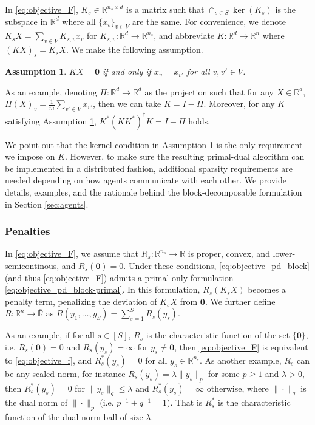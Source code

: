 \documentclass[10pt]{article}
\newcommand{\mb}{\mathbf}
\newcommand{\R}{\mathbb{R}}
\newtheorem{assumption}{Assumption}[section]
\begin{document}
In \eqref{eq:objective_F}, $K_s\in \R^{n_s\times d}$ is a matrix such that $\cap_{s\in S} \ker(K_s)$ is the subspace in $\R^{d}$ where all $\{x_v\}_{v\in V}$ are the same. For convenience, we denote $K_sX = \sum_{v\in V} K_{s,v}x_v$ for $K_{s,v}:\R^{\overline{d}}\to \R^{n_s}$, and abbreviate $K:\R^{d}\to \R^n$ where $(KX)_s = K_sX$. We make the following assumption. 
\begin{assumption}\label{assumption:kernel}
    $KX = \mb 0$ if and only if $x_v=x_{v'}$ for all $v,v'\in V$. 
\end{assumption}
As an example, denoting $\Pi:\R^{d}\to \R^{d}$ as the projection such that for any $X\in \R^{d}$, $\Pi(X)_v = \frac{1}{m}\sum_{v'\in V}x_{v'}$, then we can take $K = I-\Pi$. Moreover, for any $K$ satisfying Assumption \ref{assumption:kernel}, $K^*(KK^*)^{\dagger}K = I- \Pi$ holds.

We point out that the kernel condition in Assumption \ref{assumption:kernel} is the only requirement we impose on $K$. However, to make sure the resulting primal-dual algorithm can be implemented in a distributed fashion, additional sparsity requirements are needed depending on how agents communicate with each other. We provide details, examples, and the rationale behind the block-decomposable formulation in Section \ref{sec:agents}. 




\subsubsection{Penalties}


In \eqref{eq:objective_F}, we assume that $R_s:
\R^{n_s}\to \overline{\R}$ is proper, convex, and lower-semicontinous, and $R_s(\mb 0) = 0$. 
Under these conditions, \eqref{eq:objective_pd_block} (and thus \eqref{eq:objective_F}) admits a primal-only formulation \eqref{eq:objective_pd_block-primal}. In this formulation, $R_s(K_sX)$ becomes a penalty term, penalizing the deviation of $K_sX$ from $\mb 0$. We further define $R:\R^n\to \overline{\R}$ as $R(y_1,\ldots,y_S) = \sum_{s=1}^SR_s(y_s)$. 



As an example, if for all $s\in [S]$, $R_s$ is the characteristic function of the set $\{\mb 0\}$, i.e. $R_s(\mb 0) = 0$ and $R_s(y_s) = \infty$ for $y_s \neq \mb 0$, then \eqref{eq:objective_F} is equivalent to \eqref{eq:objective_f}, and $R_s^*(y_s) = 0$ for all $y_s\in \R^{n_s}$. As another example, $R_s$ can be any scaled norm, for instance $R_s(y_s) = \lambda \|y_s\|_p$ for some $p\geq 1$ and $\lambda>0$, then $R_s^*(y_s) = 0$ for $\|y_s\|_q\leq \lambda$ and $R_s^*(y_s) = \infty$ otherwise, where $\|\cdot \|_q $ is the dual norm of $\|\cdot\|_p$ (i.e. $p^{-1}+q^{-1}=1$). That is $R_s^*$ is the characteristic function of the dual-norm-ball of size $\lambda$. 
\end{document}
